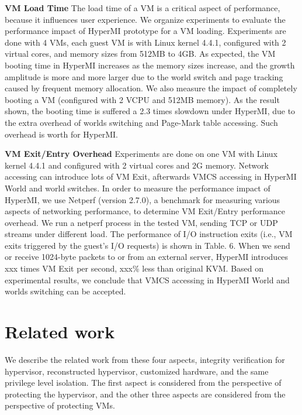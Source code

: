 \documentclass[conference]{IEEEtran}
\begin{document}
\textbf {VM Load Time}
The load time of a VM is a critical aspect of performance, because it influences user experience. We organize experiments to evaluate the performance impact of HyperMI prototype for a VM loading. Experiments are done with 4 VMs, each guest VM is with Linux kernel 4.4.1, configured with 2 virtual cores, and memory sizes from 512MB to 4GB.
 As expected, the VM booting time in HyperMI increases as the memory sizes increase, and the growth amplitude is more and more larger due to the world switch and page tracking caused by frequent memory allocation. We also measure the impact of completely booting a VM (configured with 2 VCPU and 512MB memory). As the result shown, the booting time is suffered a 2.3 times slowdown under HyperMI, due to the extra overhead of worlds switching and Page-Mark table accessing. Such overhead is worth for HyperMI.

\textbf {VM Exit/Entry Overhead}
Experiments are done on one VM with Linux kernel 4.4.1 and configured with 2 virtual cores and 2G memory. Network accessing can introduce lots of VM Exit, afterwards VMCS accessing in HyperMI World and world switches. In order to measure the performance impact of HyperMI, we use Netperf (version 2.7.0), a benchmark for measuring various aspects of networking performance, to determine VM Exit/Entry performance overhead. We run a netperf process in the tested VM, sending TCP or UDP streams under different load. The performance of I/O instruction exits (i.e., VM exits triggered by the guest's I/O requests) is shown in Table. 6. When we send or receive 1024-byte packets to or from an external server, HyperMI introduces xxx times VM Exit per second, xxx\% less than original KVM. Based on experimental results, we conclude that VMCS accessing in HyperMI World and worlds switching can be accepted.



\section{Related work}\label{sec:related}
We describe the related work from these four aspects, integrity verification for hypervisor, reconstructed hypervisor, customized hardware, and the same privilege level isolation. The first aspect is considered from the perspective of protecting the hypervisor, and the other three aspects are considered from the perspective of protecting VMs.

\end{document}
